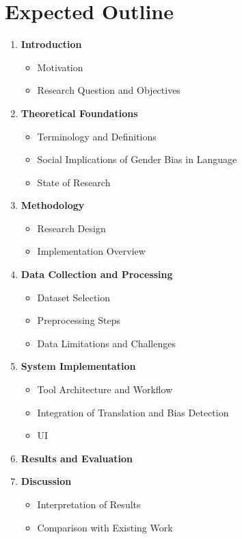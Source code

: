 \section{Expected Outline}
\begin{enumerate}
  \item \textbf{Introduction}
    \begin{itemize}
      \item Motivation
      \item Research Question and Objectives
    \end{itemize}

  \item \textbf{Theoretical Foundations}
    \begin{itemize}
      \item Terminology and Definitions
      \item Social Implications of Gender Bias in Language
      \item State of Research
    \end{itemize}

  \item \textbf{Methodology}
    \begin{itemize}
      \item Research Design
      \item Implementation Overview
    \end{itemize}

  \item \textbf{Data Collection and Processing}
    \begin{itemize}
      \item Dataset Selection
      \item Preprocessing Steps
      \item Data Limitations and Challenges
    \end{itemize}

  \item \textbf{System Implementation}
    \begin{itemize}
      \item Tool Architecture and Workflow
      \item Integration of Translation and Bias Detection
      \item UI
    \end{itemize}

  \item \textbf{Results and Evaluation}

  \item \textbf{Discussion}
    \begin{itemize}
      \item Interpretation of Results
      \item Comparison with Existing Work
    \end{itemize}


\end{enumerate}
